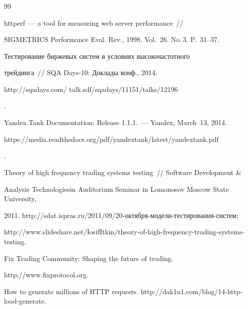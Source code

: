 {{\begin{thebibliography}{99}


   httperf~--- a tool for measuring web server performance~/\!\!/


SIGMETRICS Performance Eval. Rev., 1998. Vol.~26. No.\,3. P.~31--37.













   Тестирование биржевых систем в условиях высокочастотного


трейдинга~/\!\!/ SQA Days-10: Доклады конф., 2014. {\sf


http://sqadays.com/ talk.sdf/sqadays/11151/talks/12196}.







  Yandex.Tank Documentation: Release 1.1.1.~--- Yandex, March~13, 2014. {\sf


https://media.readthedocs.org/pdf/yandextank/latest/yandextank.pdf}.




   Theory of high frequency trading systems testing~/\!\!/ Software Development \&


Analysis Technologiesin Auditorium Seminar in Lomonosov Moscow State University,


2011. {\sf http://sdat.ispras.ru/2011/09/20-октября-модели-тестирования-систем};


{\sf http://www.slideshare.net/IosifItkin/theory-of-high-frequency-trading-systems-testing}.







  Fix Trading Community: Shaping the future of trading.


  {\sf http://www.fixprotocol.org}.




  How to generate millions of HTTP requests. {\sf http://dak1n1.com/blog/14-http-load-generate}.








\end{thebibliography}


}


}






